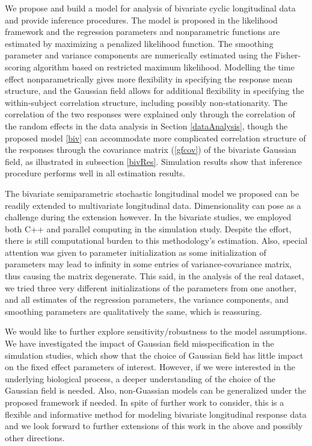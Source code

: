 \documentclass[review]{elsarticle}
\begin{document}
We propose and build a model for analysis of bivariate cyclic longitudinal data and provide inference procedures. The model is proposed in the likelihood framework and the regression parameters and nonparametric functions are estimated by maximizing a penalized likelihood function.  
The smoothing parameter and variance components are numerically estimated using the Fisher-scoring algorithm based on restricted maximum likelihood.
Modelling the time effect nonparametrically gives more flexibility in specifying the response mean structure, and the Gaussian field allows for additional flexibility in specifying the within-subject correlation structure, including possibly non-stationarity. 
The correlation of the two responses were explained only through the correlation of the random effects in the data analysis in Section \ref{dataAnalysis}, though the proposed model \ref{biv} can accommodate more complicated correlation structure of the responses through the covariance matrix (\ref{gfcov}) of the bivariate Gaussian field, as illustrated in subsection \ref{bivRes}. Simulation results show that inference procedure performs well in all estimation results.


The bivariate semiparametric stochastic longitudinal model we proposed can be readily extended to multivariate longitudinal data.   
Dimensionality can pose as a challenge during the extension however. In the bivariate studies, we employed both C++ and parallel computing in the simulation study. Despite the effort, there is still computational burden to this methodology's estimation. Also, special attention was given to parameter initialization as some initialization of parameters may lead to infinity in some entries of variance-covariance matrix, thus causing the matrix degenerate. This said, in the analysis of the real dataset, we tried three very different initializations of the parameters from one another, and all estimates of the regression parameters, the variance components, and smoothing parameters are qualitatively the same, which is reassuring. 


We would like to further explore sensitivity/robustness to the model assumptions. We have investigated the impact of Gaussian field misspecification in the simulation studies, which show that the choice of Gaussian field has little impact on the fixed effect parameters of interest. However, if we were interested in the underlying biological process, a deeper understanding of the choice of the Gaussian field is needed. 
Also, non-Guassian models can be generalized under the proposed framework if needed.
In spite of further work to consider, this is a flexible and informative method for modeling bivariate  longitudinal response data and we look forward to further extensions of this work in the above and possibly other directions.
\end{document}

